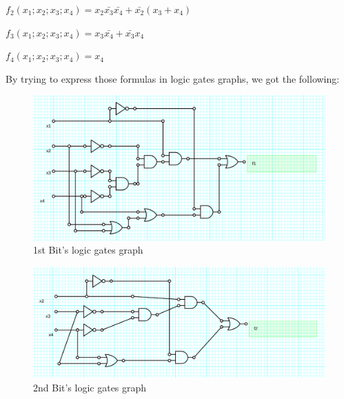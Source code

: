 \begin{center}
$f_{2}(x_{1};x_{2};x_{3};x_{4})=x_{2}\bar{x_{3}}\bar{x_{4}}+\bar{x_{2}}(x_{3}+x_{4})$
\par\end{center}

\begin{center}
$f_{3}(x_{1};x_{2};x_{3};x_{4})=x_{3}\bar{x_{4}}+\bar{x_{3}}x_{4}$
\par\end{center}

\begin{center}
$f_{4}(x_{1};x_{2};x_{3};x_{4})=x_{4}$
\par\end{center}

By trying to express those formulas in logic gates graphs, we got
the following:

\begin{figure}[!] %
\begin{centering}
\includegraphics[scale=0.25]{E4TP1/images/1}
\par\end{centering}
\caption{1st Bit's logic gates graph}
\end{figure}

\begin{figure}[!]%
\begin{centering}
\includegraphics[scale=0.25]{E4TP1/images/2}
\par\end{centering}
\caption{2nd Bit's logic gates graph}
\end{figure}

